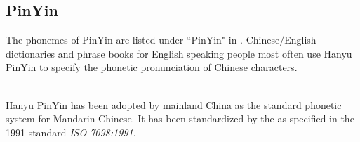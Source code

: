 \subsection{PinYin}
\label{sec:pinyin}
\begin{minipage}{\tw-85mm}
The phonemes of PinYin are listed under ``PinYin" in .
Chinese/English dictionaries and phrase books for English speaking people
most often use Hanyu PinYin to specify the phonetic pronunciation
of Chinese characters.
\end{minipage}%
\hfill{}\\
Hanyu PinYin has been adopted by mainland China
as the standard phonetic system for Mandarin Chinese.
It has been standardized by the 
as specified in the 1991 standard \emph{ISO 7098:1991}.


